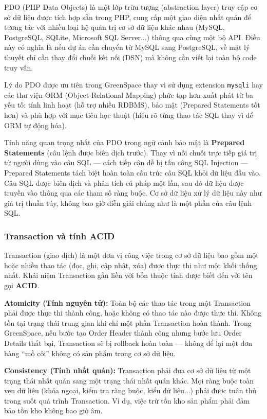 \documentclass[11pt, a4paper]{article}
\begin{document}
PDO (PHP Data Objects) là một lớp trừu tượng (abstraction layer) truy cập cơ sở dữ liệu được tích hợp sẵn trong PHP, cung cấp một giao diện nhất quán để tương tác với nhiều loại hệ quản trị cơ sở dữ liệu khác nhau (MySQL, PostgreSQL, SQLite, Microsoft SQL Server...) thông qua cùng một bộ API. Điều này có nghĩa là nếu dự án cần chuyển từ MySQL sang PostgreSQL, về mặt lý thuyết chỉ cần thay đổi chuỗi kết nối (DSN) mà không cần viết lại toàn bộ code truy vấn.

Lý do PDO được ưu tiên trong GreenSpace thay vì sử dụng extension \texttt{mysqli} hay các thư viện ORM (Object-Relational Mapping) phức tạp hơn xuất phát từ ba yếu tố: tính linh hoạt (hỗ trợ nhiều RDBMS), bảo mật (Prepared Statements tốt hơn) và phù hợp với mục tiêu học thuật (hiểu rõ từng thao tác SQL thay vì để ORM tự động hóa).

Tính năng quan trọng nhất của PDO trong ngữ cảnh bảo mật là \textbf{Prepared Statements} (câu lệnh được biên dịch trước). Thay vì nối chuỗi trực tiếp giá trị từ người dùng vào câu SQL --- cách tiếp cận dễ bị tấn công SQL Injection --- Prepared Statements tách biệt hoàn toàn cấu trúc câu SQL khỏi dữ liệu đầu vào. Câu SQL được biên dịch và phân tích cú pháp một lần, sau đó dữ liệu được truyền vào thông qua các tham số ràng buộc. Cơ sở dữ liệu xử lý dữ liệu này như giá trị thuần túy, không bao giờ diễn giải chúng như là một phần của câu lệnh SQL.

\subsubsection{Transaction và tính ACID}

Transaction (giao dịch) là một đơn vị công việc trong cơ sở dữ liệu bao gồm một hoặc nhiều thao tác (đọc, ghi, cập nhật, xóa) được thực thi như một khối thống nhất. Khái niệm Transaction gắn liền với bốn thuộc tính được biết đến với tên gọi \textbf{ACID}.

\textbf{Atomicity (Tính nguyên tử):} Toàn bộ các thao tác trong một Transaction phải được thực thi thành công, hoặc không có thao tác nào được thực thi. Không tồn tại trạng thái trung gian khi chỉ một phần Transaction hoàn thành. Trong GreenSpace, nếu bước tạo Order Header thành công nhưng bước lưu Order Details thất bại, Transaction sẽ bị rollback hoàn toàn --- không để lại một đơn hàng ``mồ côi'' không có sản phẩm trong cơ sở dữ liệu.

\textbf{Consistency (Tính nhất quán):} Transaction phải đưa cơ sở dữ liệu từ một trạng thái nhất quán sang một trạng thái nhất quán khác. Mọi ràng buộc toàn vẹn dữ liệu (khóa ngoại, kiểm tra ràng buộc, kiểu dữ liệu...) phải được tuân thủ trong suốt quá trình Transaction. Ví dụ, việc trừ tồn kho sản phẩm phải đảm bảo tồn kho không bao giờ âm.
\end{document}
